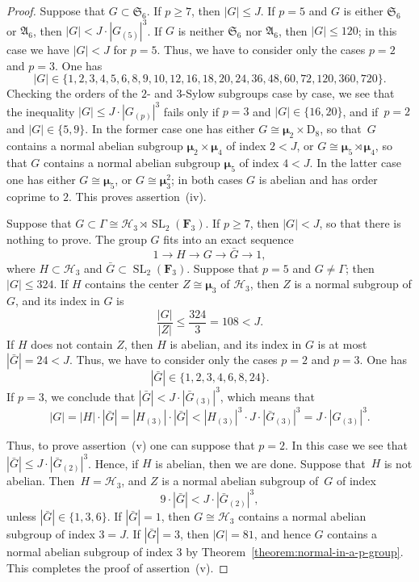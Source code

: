 \documentclass[10pt,a4paper]{amsart}
\newcommand{\DD}{\mathrm D}
\newcommand{\HHH}{\mathscr{H}}
\DeclareMathOperator{\SL}{SL}
\def \ge {\geqslant}
\def \le {\leqslant}
\newcommand{\mumu}{\boldsymbol{\mu}}
\begin{document}
\begin{proof}
Suppose that $G\subset\mathfrak{S}_6$.
If $p\ge 7$, then $|G|\le J$. If $p=5$ and $G$ is either $\mathfrak{S}_6$ or $\mathfrak{A}_6$,
then $|G|<J\cdot |G_{(5)}|^3$. If $G$ is neither $\mathfrak{S}_6$ nor $\mathfrak{A}_6$,
then $|G|\le 120$; in this case we have $|G|< J$ for $p=5$.
Thus, we have to consider only the cases $p=2$ and $p=3$.
One has
$$
|G|\in\{1,2,3,4,5,6,8,9,10,12,16,18,20,24,36,48,60,72,120,360,720\}.
$$
Checking the orders of the $2$- and $3$-Sylow subgroups case by case, we see that the
inequality $|G|\le J\cdot |G_{(p)}|^3$ fails only if $p=3$ and $|G|\in\{16,20\}$,
and if~\mbox{$p=2$} and $|G|\in\{5,9\}$. In the former case one has either $G\cong \mumu_2\times\DD_8$,
so that~$G$ contains a normal abelian subgroup $\mumu_2\times\mumu_4$ of index $2<J$,
or $G\cong \mumu_5\rtimes\mumu_4$, so that $G$ contains a normal abelian subgroup $\mumu_5$ of index $4<J$. In the latter case one has either $G\cong \mumu_5$, or $G\cong \mumu_3^2$;
in both cases $G$ is abelian and has order coprime to $2$.
This proves assertion~(iv).

Suppose that $G\subset \Gamma\cong\HHH_3\rtimes\SL_2(\mathbf{F}_3)$.
If $p\ge 7$, then $|G|<J$, so that there is nothing to prove.
The group $G$ fits into
an exact sequence
$$
1\to H\to G\to\bar{G}\to 1,
$$
where $H\subset \HHH_3$ and $\bar{G}\subset\SL_2(\mathbf{F}_3)$.
Suppose that $p=5$ and $G\neq \Gamma$; then~\mbox{$|G|\le 324$}.
If $H$ contains the center $Z\cong\mumu_3$ of $\HHH_3$, then $Z$ is a normal subgroup
of $G$, and its index in $G$ is
$$
\frac{|G|}{|Z|}\le \frac{324}{3}=108<J.
$$
If $H$ does not contain $Z$, then $H$ is abelian, and its index in $G$
is at most~\mbox{$|\bar{G}|=24<J$}. Thus, we have to consider only the cases $p=2$ and $p=3$.
One has
$$
|\bar{G}|\in\{1,2,3,4,6,8,24\}.
$$
If $p=3$, we conclude that $|\bar{G}|<J\cdot |\bar{G}_{(3)}|^3$, which means that
$$
|G|=|H|\cdot |\bar{G}|=|H_{(3)}|\cdot |\bar{G}|<|H_{(3)}|^3\cdot J\cdot |\bar{G}_{(3)}|^3=
J\cdot |G_{(3)}|^3.
$$

Thus, to prove assertion~(v) one can suppose that $p=2$. In this case we see that
$|\bar{G}|\le J\cdot |\bar{G}_{(2)}|^3$. Hence, if $H$ is abelian, then
we are done. Suppose that~$H$ is not abelian.
Then~\mbox{$H=\HHH_3$}, and $Z$ is a normal abelian subgroup of~$G$ of index
$$
9\cdot |\bar{G}|<J\cdot |\bar{G}_{(2)}|^3,
$$
unless $|\bar{G}|\in\{1,3,6\}$. If $|\bar{G}|=1$, then $G\cong \HHH_3$ contains a normal
abelian subgroup of index $3=J$. If $|\bar{G}|=3$, then $|G|=81$, and hence
$G$ contains a normal abelian subgroup of index $3$ by Theorem~\ref{theorem:normal-in-a-p-group}.
This completes the proof of assertion~(v).


\end{proof}
\end{document}
